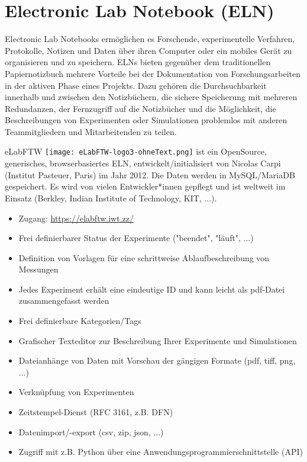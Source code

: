 \section[Electronic Lab Notebook]{Electronic Lab Notebook (ELN)}\label{ssc:ELN}

Electronic Lab Notebooks ermöglichen es Forschende, experimentelle
Verfahren, Protokolle, Notizen und Daten über ihren Computer oder ein mobiles
Gerät zu organisieren und zu speichern. ELNs bieten gegenüber dem traditionellen
Papiernotizbuch mehrere Vorteile bei der Dokumentation von Forschungsarbeiten in
der aktiven Phase eines Projekts. Dazu gehören die Durchsuchbarkeit innerhalb
und zwischen den Notizbüchern, die sichere Speicherung mit mehreren Redundanzen,
der Fernzugriff auf die Notizbücher und die Möglichkeit, die Beschreibungen von
Experimenten oder Simulationen problemlos mit anderen Teammitgliedern und
Mitarbeitenden zu teilen.

eLabFTW \texttt{[image: eLabFTW-logo3-ohneText.png]} ist ein OpenSource, generisches, browserbasiertes ELN, entwickelt/initialisiert von Nicolas Carpi (Institut Pasteuer, Paris) im Jahr 2012. Die Daten werden in MySQL/MariaDB gespeichert. Es wird von vielen Entwickler*innen gepflegt und ist weltweit im Einsatz (Berkley, Indian Institute of Technology, KIT, ...).
\begin{itemize}
  \item Zugang: \url{https://elabftw.iwt.zz/}
  \item Frei definierbarer Status der Experimente ("beendet", "läuft", ...)
  \item Definition von Vorlagen für eine schrittweise Ablaufbeschreibung von
        Messungen
  \item Jedes Experiment erhält eine eindeutige ID und kann leicht als pdf-Datei
        zusammengefasst werden
  \item Frei definierbare Kategorien/Tags
  \item Grafischer Texteditor zur Beschreibung Ihrer Experimente und Simulationen
  \item Dateianhänge von Daten mit Vorschau der gängigen Formate (pdf, tiff,
        png, ...)
  \item Verknüpfung von Experimenten
  \item Zeitstempel-Dienst (RFC 3161, z.B. DFN)
  \item Datenimport/-export (csv, zip, json, ...)
  \item Zugriff mit z.B. Python über eine Anwendungsprogrammierschnittstelle (API)
\end{itemize}


